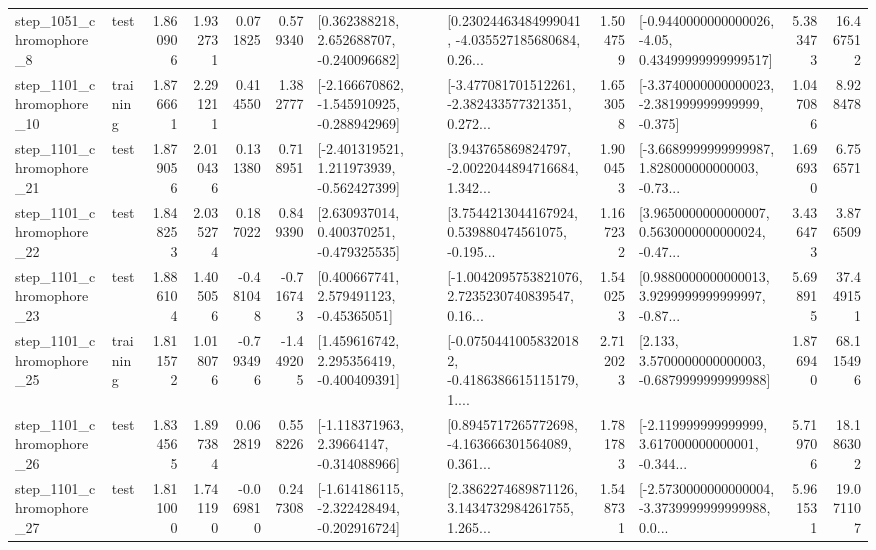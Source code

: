 \begin{tabular}{llrrrrllrlrr}
  step\_1051\_chromophore\_8 &      test &      1.860906 &    1.932731 &      0.071825 &  0.579340 &    [0.362388218, 2.652688707, -0.240096682] &  [0.23024463484999041, -4.035527185680684, 0.26... &       1.504759 &  [-0.9440000000000026, -4.05, 0.43499999999999517] &            5.383473 &         16.467512 \\
 step\_1101\_chromophore\_10 &  training &      1.876661 &    2.291211 &      0.414550 &  1.382777 &  [-2.166670862, -1.545910925, -0.288942969] &  [-3.477081701512261, -2.382433577321351, 0.272... &       1.653058 &  [-3.3740000000000023, -2.381999999999999, -0.375] &            1.047086 &          8.928478 \\
 step\_1101\_chromophore\_21 &      test &      1.879056 &    2.010436 &      0.131380 &  0.718951 &   [-2.401319521, 1.211973939, -0.562427399] &  [3.943765869824797, -2.0022044894716684, 1.342... &       1.900453 &  [-3.6689999999999987, 1.828000000000003, -0.73... &            1.696930 &          6.756571 \\
 step\_1101\_chromophore\_22 &      test &      1.848253 &    2.035274 &      0.187022 &  0.849390 &    [2.630937014, 0.400370251, -0.479325535] &  [3.7544213044167924, 0.539880474561075, -0.195... &       1.167232 &  [3.9650000000000007, 0.5630000000000024, -0.47... &            3.436473 &          3.876509 \\
 step\_1101\_chromophore\_23 &      test &      1.886104 &    1.405056 &     -0.481048 & -0.716743 &     [0.400667741, 2.579491123, -0.45365051] &  [-1.0042095753821076, 2.7235230740839547, 0.16... &       1.540253 &  [0.9880000000000013, 3.9299999999999997, -0.87... &            5.698915 &         37.449151 \\
 step\_1101\_chromophore\_25 &  training &      1.811572 &    1.018076 &     -0.793496 & -1.449205 &    [1.459616742, 2.295356419, -0.400409391] &  [-0.07504410058320182, -0.4186386615115179, 1.... &       2.712023 &   [2.133, 3.5700000000000003, -0.6879999999999988] &            1.876940 &         68.115496 \\
 step\_1101\_chromophore\_26 &      test &      1.834565 &    1.897384 &      0.062819 &  0.558226 &    [-1.118371963, 2.39664147, -0.314088966] &  [0.8945717265772698, -4.163666301564089, 0.361... &       1.781783 &  [-2.119999999999999, 3.617000000000001, -0.344... &            5.719706 &         18.186302 \\
 step\_1101\_chromophore\_27 &      test &      1.811000 &    1.741190 &     -0.069810 &  0.247308 &  [-1.614186115, -2.322428494, -0.202916724] &  [2.3862274689871126, 3.1434732984261755, 1.265... &       1.548731 &  [-2.5730000000000004, -3.3739999999999988, 0.0... &            5.961531 &         19.071107 \\

\end{tabular}
